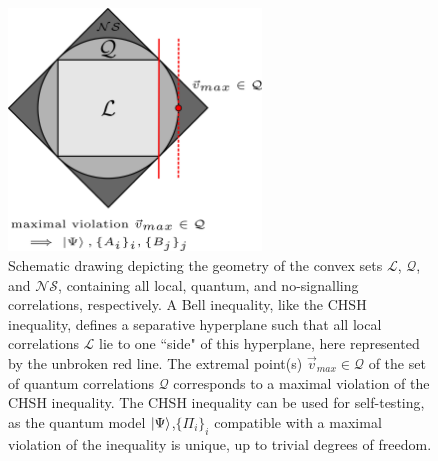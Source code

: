 \begin{figure}
    \centering
    \includegraphics[width=0.6\textwidth]{images/self-testingcorr.png}
    \caption{Schematic drawing depicting the geometry of the convex sets $\mathcal{L}$, $\mathcal{Q}$, and $\mathcal{NS}$, containing all local, quantum, and no-signalling correlations, respectively. A Bell inequality, like the CHSH inequality, defines a separative hyperplane such that all local correlations $\mathcal{L}$ lie to one ``side" of this hyperplane, here represented by the unbroken red line. The extremal point(s) $\Vec{v}_{max}\in\mathcal{Q}$ of the set of quantum correlations $\mathcal{Q}$ corresponds to a maximal violation of the CHSH inequality. The CHSH inequality can be used for self-testing, as the quantum model $\ket{\Psi}$,$\{\Pi_i\}_i$ compatible with a maximal violation of the inequality is unique, up to trivial degrees of freedom.}
    \label{fig:selftestingcorr}
\end{figure}

